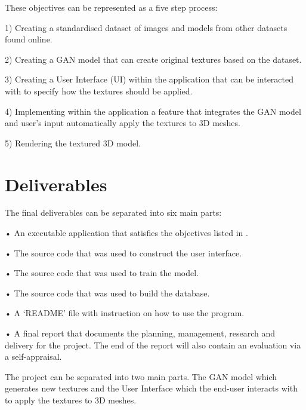 \noindent These objectives can be represented as a five step process:
\medbreak
\hfill\begin{minipage}{\dimexpr\textwidth-1cm}
\xdef\tpd{\the\prevdepth}

1) Creating a standardised dataset of images and models from other datasets found online.

2) Creating a GAN model that can create original textures based on the dataset.

3) Creating a User Interface (UI) within the application that can be interacted with to specify how the textures should be applied.

4) Implementing within the application a feature that integrates the GAN model and user's input automatically apply the textures to 3D meshes.

5) Rendering the textured 3D model.
\end{minipage}



\section{Deliverables}
\label{sec:deliverables}
\noindent The final deliverables can be separated into six main parts:
\medbreak
\hfill\begin{minipage}{\dimexpr\textwidth-1cm}
\xdef\tpd{\the\prevdepth}

•	An executable application that satisfies the objectives listed in .

•	The source code that was used to construct the user interface.

•	The source code that was used to train the model.

•	The source code that was used to build the database. 

•	A ‘README’ file with instruction on how to use the program.

•	A final report that documents the planning, management, research and delivery for the project. The end of the report will also contain an evaluation via a self-appraisal.
\end{minipage}
\medbreak 


\noindent The project can be separated into two main parts. The GAN model which generates new textures and the User Interface which the end-user interacts with to apply the textures to 3D meshes. 

